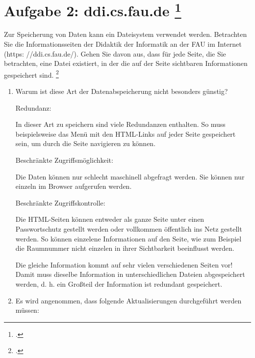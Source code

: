 \documentclass{lehramt-informatik-aufgabe}
\begin{document}

\section{Aufgabe 2: ddi.cs.fau.de
\footcite[Seite 1]{db:ab:1}}

Zur Speicherung von Daten kann ein Dateisystem verwendet werden.
Betrachten Sie die Informationsseiten der Didaktik der Informatik an der
FAU im Internet (https: //ddi.cs.fau.de/). Gehen Sie davon aus, dass für
jede Seite, die Sie betrachten, eine Datei existiert, in der die auf der
Seite sichtbaren Informationen gespeichert sind.
\footcite[Seite 19-20]{winter}

\begin{enumerate}


\item Warum ist diese Art der Datenabspeicherung nicht besonders
günstig?

\begin{antwort}
Redundanz:

In dieser Art zu speichern sind viele Redundanzen enthalten. So muss
beispielsweise das Menü mit den HTML-Links auf jeder Seite gespeichert
sein, um durch die Seite navigieren zu können.

Beschränkte Zugriffsmöglichkeit:

Die Daten können nur
schlecht maschinell abgefragt werden. Sie können nur einzeln im Browser
aufgerufen werden.

Beschränkte Zugriffskontrolle:

Die HTML-Seiten können entweder als ganze Seite unter einen
Passwortschutz gestellt werden oder vollkommen öffentlich ins Netz
gestellt werden. So können einzelene Informationen auf den Seite, wie
zum Beispiel die Raumnummer nicht einzelen in ihrer Sichtbarkeit
beeinflusst werden.
\end{antwort}

\begin{antwort}
Die gleiche Information kommt auf sehr vielen verschiedenen Seiten vor!
Damit muss dieselbe Information in unterschiedlichen Dateien
abgespeichert werden, d. h. ein Großteil der Information ist redundant
gespeichert.
\end{antwort}


\item Es wird angenommen, dass folgende Aktualisierungen durchgeführt
werden müssen:


\end{enumerate}
\end{document}
